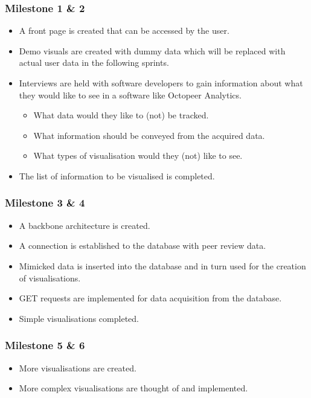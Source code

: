 \documentclass{article}
\begin{document}
    \subsubsection{Milestone 1 \& 2}
    \begin{itemize}
        \item A front page is created that can be accessed by the user.
        \item Demo visuals are created with dummy data which will be replaced with actual user data in the following sprints.
        \item Interviews are held with software developers to gain information about what they would like to see in a software like Octopeer Analytics.
            \begin{itemize}
                \item What data would they like to (not) be tracked.
                \item What information should be conveyed from the acquired data.
                \item What types of visualisation would they (not) like to see.
            \end{itemize}
        \item The list of information to be visualised is completed.
    \end{itemize}
    
    \subsubsection{Milestone 3 \& 4}
    \begin{itemize}
        \item A backbone architecture is created.
        \item A connection is established to the database with peer review data.
        \item Mimicked data is inserted into the database and in turn used for the creation of visualisations.
        \item GET requests are implemented for data acquisition from the database.
        \item Simple visualisations completed.
    \end{itemize}
    
    
    \subsubsection{Milestone 5 \& 6}
    \begin{itemize}
        \item More visualisations are created.
        \item More complex visualisations are thought of and implemented. 
    \end{itemize}
    
\end{document}
